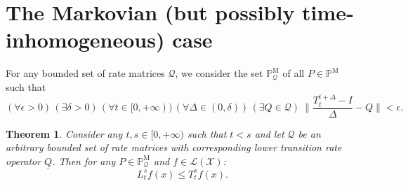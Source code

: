 \documentclass[a4paper,reqno]{amsart}
\newtheorem{theorem}{Theorem}
\newcommand{\states}{\mathcal{X}}
\newcommand{\processes}{\mathbb{P}}
\newcommand{\mprocesses}{\processes^{\mathrm{M}}}
\newcommand{\lbound}{L}
\newcommand{\gambles}{\mathcal{L}}
\newcommand{\gamblesX}{\gambles(\states)}
\newcommand{\rateset}{\mathcal{Q}}
\newcommand{\lrate}{\underline{Q}}
\begin{document}
\section{The Markovian (but possibly time-inhomogeneous) case}

For any bounded set of rate matrices $\rateset$, we consider the set $\mprocesses_{\rateset}$ of all $P\in\mprocesses$ such that
\begin{equation}\label{eq:conditionforMarkov}
(\forall\epsilon>0)\,
(\exists\delta>0)\,
(\forall t\in[0,+\infty))\,
(\forall\Delta\in(0,\delta))\,
(\exists Q\in\rateset)~
\Big\lVert\frac{T_t^{t+\Delta}-I}{\Delta}-Q\Big\rVert<\epsilon.
\end{equation}

\begin{theorem}
Consider any $t,s\in[0,+\infty)$ such that $t<s$ and let $\rateset$ be an arbitrary bounded set of rate matrices with corresponding lower transition rate operator $\lrate$. Then for any $P\in\mprocesses_\rateset$ and $f\in\gamblesX$:
\begin{equation*}
\lbound_t^sf(x)\leq T_t^sf(x).
\end{equation*}
\end{theorem}
\end{document}
